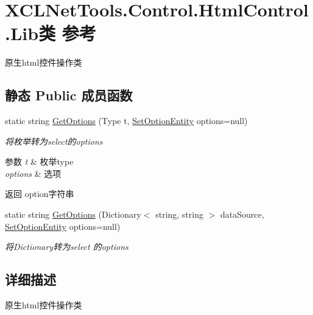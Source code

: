 \hypertarget{class_x_c_l_net_tools_1_1_control_1_1_html_control_1_1_lib}{\section{X\-C\-L\-Net\-Tools.\-Control.\-Html\-Control.\-Lib类 参考}
\label{class_x_c_l_net_tools_1_1_control_1_1_html_control_1_1_lib}
}


原生html控件操作类  


\subsection*{静态 Public 成员函数}
\begin{DoxyCompactItemize}
\item 
static string \hyperlink{class_x_c_l_net_tools_1_1_control_1_1_html_control_1_1_lib_a6bc535ff27a3e67b2c4dac1d5e99aa8c}{Get\-Options} (Type t, \hyperlink{class_x_c_l_net_tools_1_1_entity_1_1_set_option_entity}{Set\-Option\-Entity} options=null)
\begin{DoxyCompactList}\small\item\em 将枚举转为select的options 
\begin{DoxyParams}{参数}
{\em t} & 枚举type\\
\hline
{\em options} & 选项\\
\hline
\end{DoxyParams}
\begin{DoxyReturn}{返回}
option字符串
\end{DoxyReturn}
\end{DoxyCompactList}\item 
static string \hyperlink{class_x_c_l_net_tools_1_1_control_1_1_html_control_1_1_lib_aea5ab0601c97a418ef6291f75aa7baff}{Get\-Options} (Dictionary$<$ string, string $>$ data\-Source, \hyperlink{class_x_c_l_net_tools_1_1_entity_1_1_set_option_entity}{Set\-Option\-Entity} options=null)
\begin{DoxyCompactList}\small\item\em 将\-Dictionary转为select 的options \end{DoxyCompactList}\end{DoxyCompactItemize}


\subsection{详细描述}
原生html控件操作类 



